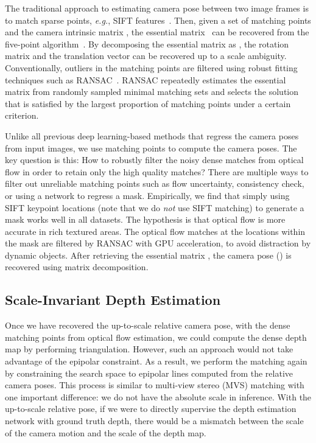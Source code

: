 \documentclass[final]{cvpr}
\def\eg{\emph{e.g.}}
\begin{document}
The traditional approach to estimating camera pose between two image frames is to match sparse points, \eg, SIFT features~\cite{loweSIFT}. 
Then, given a set of matching points  and the camera intrinsic matrix , the essential matrix~\cite{longuet1981computer}  can be recovered from the five-point algorithm~\cite{nister2004efficient,li2006five}. 
By decomposing the essential matrix as , the rotation matrix  and the translation vector  can be recovered up to a scale ambiguity. 
Conventionally, outliers in the matching points are filtered using robust fitting techniques such as RANSAC~\cite{fischler1981random}. RANSAC repeatedly estimates the essential matrix from randomly sampled minimal matching sets and selects the solution that is satisfied by the largest proportion of matching points under a certain criterion.

Unlike all previous deep learning-based methods that regress the camera poses from input images, we use matching points to compute the camera poses. 
The key question is this:  How to robustly filter the noisy dense matches from optical flow in order to retain only the high quality matches?  
There are multiple ways to filter out unreliable matching points such as flow uncertainty, consistency check, or using a network to regress a mask. 
Empirically, we find that simply using SIFT keypoint locations (note that we do \emph{not} use SIFT matching) to generate a mask works well in all datasets. 
The hypothesis is that optical flow is more accurate in rich textured areas. 
The optical flow matches at the locations within the mask
are filtered by RANSAC with GPU acceleration, to avoid distraction by dynamic objects.
After retrieving the essential matrix , the camera pose () is recovered using matrix decomposition.

\subsection{Scale-Invariant Depth Estimation}

Once we have recovered the up-to-scale relative camera pose, with the dense matching points from optical flow estimation, we could compute the dense depth map by performing triangulation. 
However, such an approach would not take advantage of the epipolar constraint.
As a result, we perform the matching again by constraining the search space to epipolar lines computed from the relative camera poses. 
This process is similar to multi-view stereo (MVS) matching with one important difference: we do not have the absolute scale in inference. 
With the up-to-scale relative pose, if we were to directly supervise the depth estimation network with ground truth depth, there would be a mismatch between the scale of the camera motion and the scale of the depth map. 
\end{document}
